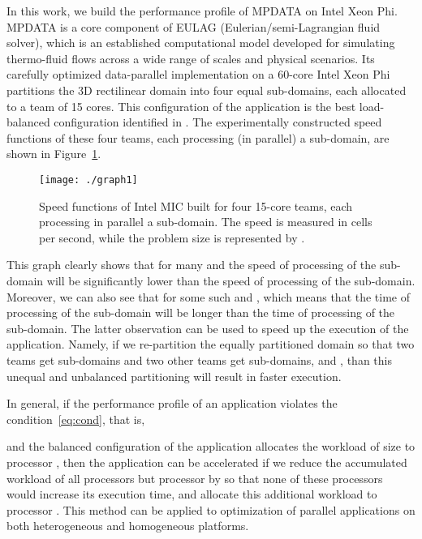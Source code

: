 \documentclass{acm_proc_article-sp}
\begin{document}
In this work, we build the performance profile of MPDATA on Intel Xeon Phi. MPDATA is a core component of EULAG (Eulerian/semi-Lagrangian fluid solver), which is an established computational model developed for simulating thermo-fluid flows across a wide range of scales and physical scenarios. Its carefully optimized data-parallel implementation on a 60-core Intel Xeon Phi \cite{SZU15}  partitions the 3D rectilinear  domain into four equal  sub-domains, each allocated to a team of 15 cores. This configuration of the application is the best load-balanced configuration identified in \cite{SZU15}.  The experimentally constructed speed functions of these four teams, each processing (in parallel) a  sub-domain, are shown in Figure~\ref{fig:graph1}.

\begin{figure}[h]
\begin{center}
\texttt{[image: ./graph1]}
\caption{ Speed functions of Intel MIC built for four 15-core teams, each processing in parallel a  sub-domain. The speed is measured in cells per second, while the problem size is represented by . }
\label{fig:graph1}
\end{center}
\end{figure} 


This graph clearly shows that for many  and  the speed of processing of the  sub-domain will be significantly lower than the speed of processing of the  sub-domain. Moreover, we can also see that  for some such  and , which means that the time of processing of the  sub-domain will be longer than the time of processing of the  sub-domain. The latter observation can be used to speed up the execution of the application. Namely, if we re-partition the equally partitioned domain so that two teams get   sub-domains and two other teams get   sub-domains, and , than this unequal and unbalanced partitioning will result in faster execution.

In general, if the performance profile of an application violates the condition~\ref{eq:cond}, that is,

and the balanced configuration of the application allocates the workload of size  to processor , then the application can be accelerated if we reduce the accumulated workload of all processors but processor  by  so that none of these processors would increase its execution time, and allocate this additional workload to processor .  This  method can be applied to optimization of parallel applications on both heterogeneous and homogeneous platforms.
\end{document}
